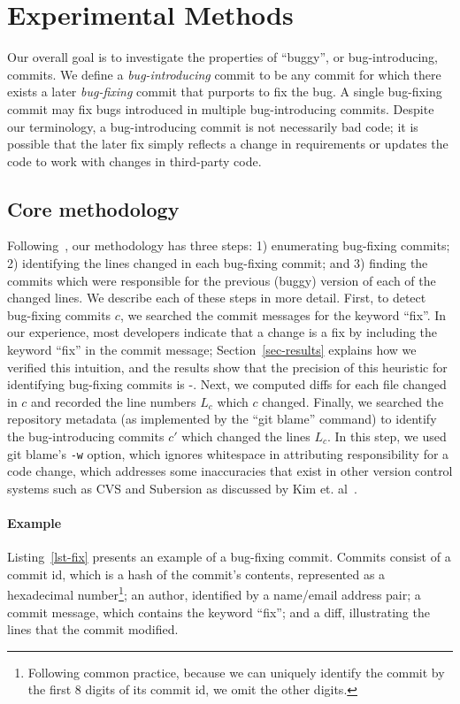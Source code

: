 \section{Experimental Methods}
\label{sec:method}
Our overall goal is to investigate the properties of ``buggy'', or
bug-introducing, commits. We define a \emph{bug-introducing} commit to be any
commit for which there exists a later \emph{bug-fixing} commit that purports to
fix the bug. A single bug-fixing commit may fix bugs introduced in
multiple bug-introducing commits. Despite our terminology,
a bug-introducing commit is not necessarily bad code; it is possible 
that the later fix simply reflects a change in requirements or updates
the code to work with changes in third-party code.

\subsection{Core methodology}
Following~\cite{sliwerski-msr-2005}, our methodology has three steps: 1) enumerating bug-fixing commits; 2)
identifying the lines changed in each bug-fixing commit; and 3)
finding the commits which were responsible for the previous (buggy)
version of each of the changed lines. We describe each of these steps
in more detail. First, to detect bug-fixing commits $c$, we searched
the commit messages for the keyword ``fix''. In our experience, most
developers indicate that a change is a fix by including the keyword
``fix'' in the commit message; Section~\ref{sec-results} explains how
we verified this intuition, and the results show that the precision
of this heuristic for identifying bug-fixing commits is \postP-\linuxP. 
Next, we computed diffs for each file
changed in $c$ and recorded the line numbers $L_c$ which $c$
changed. Finally, we searched the repository metadata (as implemented by
the ``git blame'' command) to identify the bug-introducing commits
$c'$ which changed the lines $L_c$. In this step, we used git 
blame's {\tt -w} option, which ignores whitespace in attributing 
responsibility for a code change, which addresses some 
inaccuracies that exist in other version control systems such as CVS and Subersion as 
discussed by Kim et. al~\cite{2006-automatic}.

\paragraph{Example} Listing~\ref{lst-fix} presents an example of a
bug-fixing commit. Commits consist of a commit id, which is a hash
of the commit's contents, represented as a hexadecimal number\footnote{Following common practice, because we can uniquely identify the commit by the first 8 digits of its commit id, we omit the other digits.}; an
author, identified by a name/email address pair; a commit message,
which contains the keyword ``fix''; and a diff, illustrating the lines
that the commit modified. 

